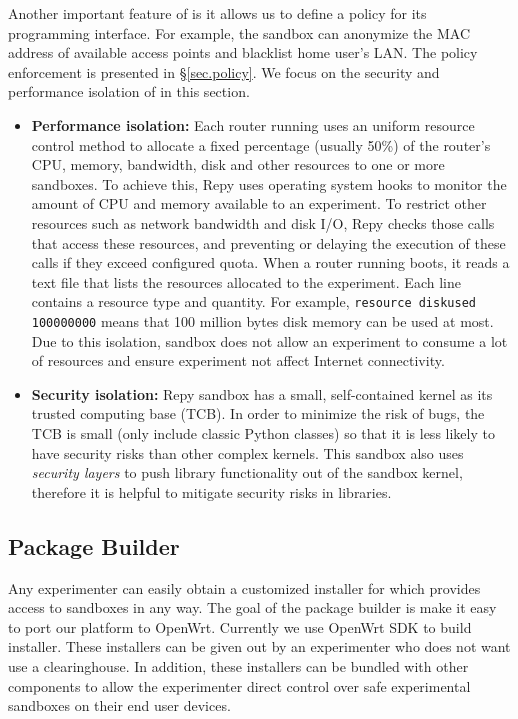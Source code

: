 Another important feature of \sandboxname is it allows us to define a policy for its programming interface. For example, the sandbox can anonymize the MAC address of available access points and blacklist home user's LAN. The policy enforcement is presented in \S{\ref{sec.policy}}. We focus on the security and performance isolation of \sandboxname in this section.
\begin{itemize}
\item \textbf{Performance isolation: }Each router running \sysname uses an uniform resource control method to allocate a fixed percentage (usually 50\%) of the router's CPU, memory, bandwidth, disk and other resources to one or more sandboxes. To achieve this, Repy uses operating system hooks to monitor the amount of CPU and memory available to an experiment. To restrict other resources such as network bandwidth and disk I/O, Repy checks those calls that access these resources, and preventing or delaying the execution of these calls if they exceed configured quota. When a router running \sysname boots, it reads a text file that lists the resources allocated to the experiment. Each line contains a resource type and quantity. For example, \texttt{resource diskused 100000000} means that 100 million bytes disk memory can be used at most. Due to this isolation, sandbox does not allow an experiment to consume a lot of resources and ensure experiment not affect Internet connectivity.

\item \textbf{Security isolation: }Repy sandbox has a small, self-contained kernel as its trusted computing base (TCB). In order to minimize the risk of bugs, the TCB is small (only include classic Python classes) so that it is less likely to have security risks than other complex kernels. This sandbox also uses \textit{security layers} to push library functionality out of the sandbox kernel, therefore it is helpful to mitigate security risks in libraries. 

\end{itemize}
\subsection{Package Builder}
\label{sec.packagebuilder}
Any experimenter can easily obtain a customized installer for \sysname which provides access to sandboxes in any way. The goal of the package builder is make it easy to port our platform to OpenWrt. Currently we use OpenWrt SDK to build installer. These installers can be given out by an experimenter who does not want use a clearinghouse. In addition, these installers can be bundled with other components to allow the experimenter direct control over safe experimental sandboxes on their end user devices.

